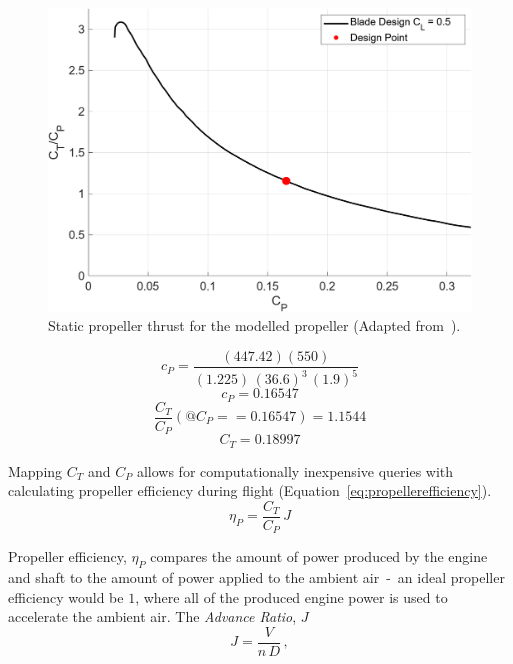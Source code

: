 \documentclass[12pt]{report}
\begin{document}
\begin{figure}[!ht]\label{fig:staticpropthrust}
  \centering
  \includegraphics[width=0.85\linewidth]{Figures/StaticThrust.png}
  \caption{Static propeller thrust for the modelled propeller (Adapted from~\cite{GeneralizedMethodPropeller}).}
\end{figure}

\begin{equation}\label{eq:calcCT1}
  c_P = \frac{(447.42)(550)}{{(1.225)} \, {(36.6)}^3 \, {(1.9)}^5}
\end{equation}
\begin{equation}\label{eq:calcCT2}
  c_P = 0.16547
\end{equation}
\begin{equation}\label{eq:calcCT3}
  \frac{C_T}{C_P}(@C_P == 0.16547) = 1.1544
\end{equation}
\begin{equation}\label{eq:calcCT4}
  C_T = 0.18997
\end{equation}


Mapping \(C_T\) and \(C_P\) allows for computationally inexpensive queries with calculating propeller efficiency during flight (Equation~\ref{eq:propellerefficiency}).
\begin{equation}\label{eq:propellerefficiency}
  \eta_P = \frac{C_T}{C_P} \, J
\end{equation}

Propeller efficiency, \( \eta_P \) compares the amount of power produced by the engine and shaft to the amount of power applied to the ambient air~-~an ideal propeller efficiency would be \(1\), where all of the produced engine power is used to accelerate the ambient air. The \textit{Advance Ratio}, \(J\)
\begin{equation}\label{eq:advanceRatio}
  J = \frac{V}{n \, D} \, ,
\end{equation}
\end{document}
